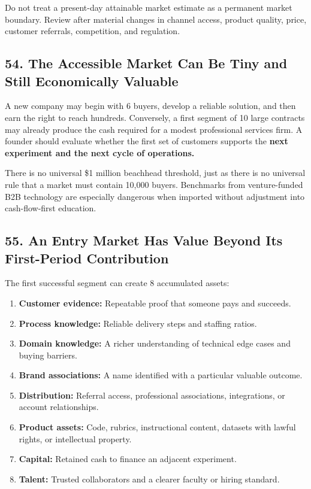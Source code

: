 Do not treat a present-day attainable market estimate as a permanent market boundary. Review after material changes in channel access, product quality, price, customer referrals, competition, and regulation.

\subsection*{54. The Accessible Market Can Be Tiny and Still Economically Valuable}

A new company may begin with 6 buyers, develop a reliable solution, and then earn the right to reach hundreds. Conversely, a first segment of 10 large contracts may already produce the cash required for a modest professional services firm. A founder should evaluate whether the first set of customers supports the \textbf{next experiment and the next cycle of operations.}

There is no universal \$1 million beachhead threshold, just as there is no universal rule that a market must contain 10,000 buyers. Benchmarks from venture-funded B2B technology are especially dangerous when imported without adjustment into cash-flow-first education.

\subsection*{55. An Entry Market Has Value Beyond Its First-Period Contribution}

The first successful segment can create 8 accumulated assets:

\begin{enumerate}
    \item \textbf{Customer evidence:} Repeatable proof that someone pays and succeeds.
    \item \textbf{Process knowledge:} Reliable delivery steps and staffing ratios.
    \item \textbf{Domain knowledge:} A richer understanding of technical edge cases and buying barriers.
    \item \textbf{Brand associations:} A name identified with a particular valuable outcome.
    \item \textbf{Distribution:} Referral access, professional associations, integrations, or account relationships.
    \item \textbf{Product assets:} Code, rubrics, instructional content, datasets with lawful rights, or intellectual property.
    \item \textbf{Capital:} Retained cash to finance an adjacent experiment.
    \item \textbf{Talent:} Trusted collaborators and a clearer faculty or hiring standard.
\end{enumerate}

